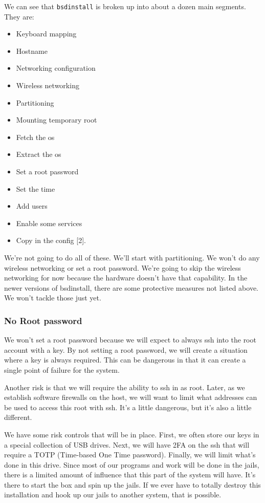 We can see that \texttt{bsdinstall} is broken up into about a dozen main segments.  They are:
\begin{itemize}
\item Keyboard mapping
\item Hostname
\item Networking \gls{configuration}
\item Wireless networking
\item Partitioning
\item Mounting temporary root
\item Fetch the \gls{os}
\item Extract the \gls{os}
\item Set a root \gls{password}
\item Set the time
\item Add users
\item Enable some services
\item Copy in the config [2].
\end{itemize}

We're not going to do all of these.  We'll start with partitioning.  We won't do any wireless networking or set a root \gls{password}.  We're going to skip the wireless networking for now because the hardware doesn't have that capability.  In the newer versions of bsdinstall, there are some protective measures not listed above.  We won't tackle those just yet.

\subsubsection{No Root \gls{password}}

We won't set a root \gls{password} because we will expect to always \gls{ssh} into the root account with a key.  By not setting a root \gls{password}, we will create a situation where a key is always required.  This can be dangerous in that it can create a single point of failure for the system.

Another risk is that we will require the ability to \gls{ssh} in as root.  Later, as we establish software firewalls on the host, we will want to limit what addresses can be used to access this root with \gls{ssh}.  It's a little dangerous, but it's also a little different.

We have some risk controls that will be in place.  First, we often store our keys in a special collection of USB drives.  Next, we will have 2FA on the \gls{ssh} that will require a TOTP (Time-based One Time \gls{password}).  Finally, we will limit what's done in this drive.  Since most of our programs and work will be done in the jails, there is a limited amount of influence that this part of the system will have.  It's there to start the box and spin up the jails.  If we ever have to totally destroy this installation and hook up our jails to another system, that is possible.

